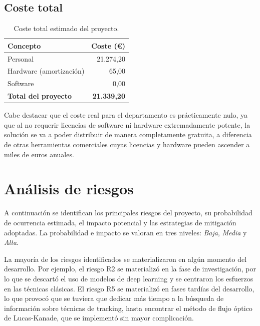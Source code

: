 \subsection{Coste total}
 
\begin{table}[H]
\centering
\caption{Coste total estimado del proyecto.}
\begin{tabular}{lr}
\hline
\textbf{Concepto} & \textbf{Coste (€)} \\
\hline
Personal                   & 21.274,20 \\
Hardware (amortización)    & 65,00     \\
Software                   & 0,00      \\
\hline
\textbf{Total del proyecto} & \textbf{21.339,20} \\
\hline
\end{tabular}
\label{tab:coste_total}
\end{table}

Cabe destacar que el coste real para el departamento es prácticamente nulo, ya que al no requerir licencias de software ni hardware extremadamente potente, la solución se va a poder distribuir de manera completamente gratuita, a diferencia de otras herramientas comerciales cuyas licencias y hardware pueden ascender a miles de euros anuales.

\section{Análisis de riesgos}

A continuación se identifican los principales riesgos del proyecto, su probabilidad de ocurrencia estimada, el impacto potencial y las estrategias de mitigación adoptadas. La probabilidad e impacto se valoran en tres niveles: \textit{Baja}, \textit{Media} y \textit{Alta}.

La mayoría de los riesgos identificados se materializaron en algún momento del desarrollo. Por ejemplo, el riesgo R2 se materializó en la fase de investigación, por lo que se descartó el uso de modelos de deep learning y se centraron los esfuerzos en las técnicas clásicas. El riesgo R5 se materializó en fases tardías del desarrollo, lo que provocó que se tuviera que dedicar más tiempo a la búsqueda de información sobre técnicas de tracking, hasta encontrar el método de flujo óptico de Lucas-Kanade, que se implementó sin mayor complicación.
 
